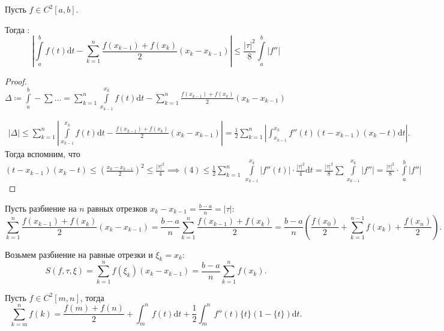 \begin{theorem}
    Пусть $f \in C^2[a, b]$.

    Тогда : \[\left|\int\limits_a^b f(t) \mathrm{d}t - \sum_{k=1}^n \frac{f(x_{k-1}) + f(x_k)}{2}(x_k - x_{k-1})\right| \le \frac{|\tau|^2}{8} \int\limits_a^b |f''|\]
\end{theorem}
\begin{proof}
    $\Delta \coloneqq \int\limits_a^b - \sum \ldots = \sum\limits_{k=1}^n \int\limits_{x_{k-1}}^{x_k}f(t)\mathrm{d}t - \sum\limits_{k=1}^n \frac{f(x_{k-1}) + f(x_k)}{2}(x_k - x_{k-1})$

    \begin{align}
        |\Delta| \le  \sum\limits_{k=1}^n |\int\limits_{x_{k-1}}^{x_k} f(t)\mathrm{d}t - \frac{f(x_{k-1}) + f(x_k)}{2}(x_k - x_{k-1})| = \frac{1}{2} \sum\limits_{k=1}^n \left| \int_{x_{k-1}}^{x_k} f''(t)(t-x_{k-1})(x_k - t)\mathrm{d}t\right|
    .\end{align} Тогда вспомним, что $(t-x_{k-1})(x_k - t) \le \left( \frac{x_k - x_{k-1}}{2}\right)^2 \le \frac{|\tau|^2}{4} \implies (4) \le \frac{1}{2} \sum\limits_{k=1}^n\ \int\limits_{x_{k-1}}^{x_k}|f''(t)| \cdot \frac{|\tau|^2}{4} \mathrm{d}t = \frac{|\tau|^2}{8} \sum \int\limits_{x_{k-1}}^{x_k} |f''| = \frac{|\tau|^2}{8} \cdot \int\limits_a^b |f''|$
\end{proof}
\begin{remark}
    Пусть разбиение на $n$ равных отрезков  $x_k - x_{k-1} = \frac{b-a}{n} = |\tau|$:
    \[
        \sum_{k=1}^n \frac{f(x_{k-1}) + f(x_k)}{2}(x_k - x_{k-1}) = \frac{b-a}{n} \sum_{k=1}^n \frac{f(x_{k-1}) + f(x_k)}{2} = \frac{b-a}{n}(\frac{f(x_0)}{2} + \sum_{k=1}^{n-1}f(x_k) + \frac{f(x_n)}{2})
    .\] 
\end{remark}
\begin{remark}
    Возьмем разбиение на равные отрезки и $\xi_k = x_k$:
     \[
         S(f, \tau, \xi) = \sum_{k=1}^n f(\xi_k)(x_k - x_{k-1}) = \frac{b-a}{n} \sum_{k=1}^n f(x_k)
    .\] 
\end{remark}
\begin{theorem}
    Пусть $f \in C^2[m, n]$, тогда
     \[
         \sum_{k=m}^n f(k) = \frac{f(m) + f(n)}{2} + \int_m^n f(t) \mathrm{d}t + \frac{1}{2} \int_m^n f''(t)\{t\}(1-\{t\})\mathrm{d}t
    .\]
\end{theorem}
